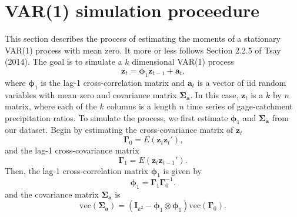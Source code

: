 \documentclass{article}
\begin{document}

\section{VAR(1) simulation proceedure} %

This section describes the process of estimating the moments of a stationary VAR(1) process with mean zero.
It more or less follows Section 2.2.5 of Tsay (2014).
The goal is to simulate a $k$ dimensional VAR(1) process
\begin{equation}
  \mathbf{z}_t = \mathbf{\phi}_1 \mathbf{z}_{t-1} + \mathbf{a}_t \text{,}
\end{equation}
where $\mathbf{\phi}_1$ is the lag-1 cross-correlation matrix
and $\mathbf{a}_t$ is a vector of iid random variables with mean zero and covariance matrix $\mathbf{\Sigma_a}$.
In this case, $\mathbf{z}_t$ is a $k$ by $n$ matrix, 
where each of the $k$ columns is a length $n$ time series of gage-catchment precipitation ratios.
To simulate the process, we first estimate $\mathbf{\phi}_1$ and $\mathbf{\Sigma_a}$ from our dataset.
Begin by estimating the cross-covariance matrix of $\mathbf{z}_t$
\begin{equation}
  \mathbf{\Gamma}_0 = E(\mathbf{z}_t \mathbf{z}_t') \text{,}
\end{equation}
and the lag-1 cross-covariance matrix
\begin{equation}
  \mathbf{\Gamma}_1 = E(\mathbf{z}_t \mathbf{z}_{t-1}') \text{.}
\end{equation}
Then, the lag-1 cross-correlation matrix $\mathbf{\phi}_1$ is given by
\begin{equation}
  \mathbf{\phi}_1 = \mathbf{\Gamma}_1 \mathbf{\Gamma}_0^{-1} \text{.}
\end{equation}
and the covariance matrix $\mathbf{\Sigma_a}$ is
\begin{equation}
  \text{vec}(\mathbf{\Sigma_a}) = (\mathbf{I}_{k^2} - \mathbf{\phi}_1 \otimes \mathbf{\phi}_1) \text{vec}(\mathbf{\Gamma}_0) \text{.}
\end{equation}
\end{document}

